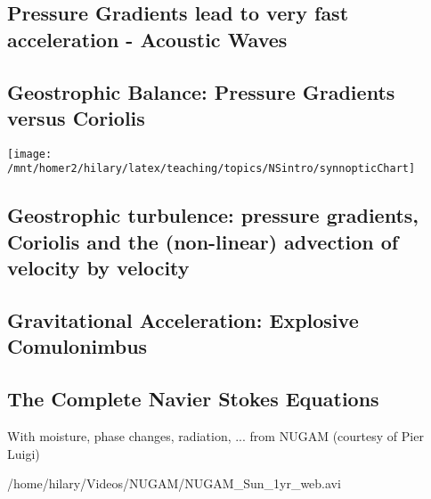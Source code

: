 \clearpage{}


\subsection*{Pressure Gradients lead to very fast acceleration - Acoustic Waves}


\clearpage{}


\subsection*{Geostrophic Balance: Pressure Gradients versus Coriolis}

\texttt{[image: /mnt/homer2/hilary/latex/teaching/topics/NSintro/synnopticChart]}

\clearpage{}


\subsection*{Geostrophic turbulence: pressure gradients, Coriolis and the (non-linear)
advection of velocity by velocity}



\subsection{Gravitational Acceleration: Explosive Comulonimbus}

\noindent {}

\clearpage{}


\subsection{The Complete Navier Stokes Equations}

With moisture, phase changes, radiation, ... from NUGAM (courtesy
of Pier Luigi)

{/home/hilary/Videos/NUGAM/NUGAM_Sun_1yr_web.avi}
